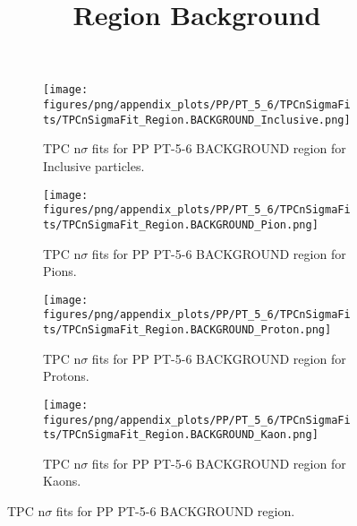             \begin{figure}[H]
                \title{Region Background}
                \begin{subfigure}[b]{0.5\textwidth}
                    \centering
                    \texttt{[image: figures/png/appendix\_plots/PP/PT\_5\_6/TPCnSigmaFits/TPCnSigmaFit\_Region.BACKGROUND\_Inclusive.png]}
                    \caption{TPC n$\sigma$ fits for PP PT-5-6 BACKGROUND region for Inclusive particles.}
                    \label{fig:appendix_PP_PT-5-6_BACKGROUND_Inclusive}
                \end{subfigure}
                \begin{subfigure}[b]{0.5\textwidth}
                    \centering
                    \texttt{[image: figures/png/appendix\_plots/PP/PT\_5\_6/TPCnSigmaFits/TPCnSigmaFit\_Region.BACKGROUND\_Pion.png]}
                    \caption{TPC n$\sigma$ fits for PP PT-5-6 BACKGROUND region for Pions.}
                    \label{fig:appendix_PP_PT-5-6_BACKGROUND_Pion}
                \end{subfigure}
                \begin{subfigure}[b]{0.5\textwidth}
                    \centering
                    \texttt{[image: figures/png/appendix\_plots/PP/PT\_5\_6/TPCnSigmaFits/TPCnSigmaFit\_Region.BACKGROUND\_Proton.png]}
                    \caption{TPC n$\sigma$ fits for PP PT-5-6 BACKGROUND region for Protons.}
                    \label{fig:appendix_PP_PT-5-6_BACKGROUND_Proton}
                \end{subfigure}
                \begin{subfigure}[b]{0.5\textwidth}
                    \centering
                    \texttt{[image: figures/png/appendix\_plots/PP/PT\_5\_6/TPCnSigmaFits/TPCnSigmaFit\_Region.BACKGROUND\_Kaon.png]}
                    \caption{TPC n$\sigma$ fits for PP PT-5-6 BACKGROUND region for Kaons.}
                    \label{fig:appendix_PP_PT-5-6_BACKGROUND_Kaon}
                \end{subfigure}
                \caption{TPC n$\sigma$ fits for PP PT-5-6 BACKGROUND region.}
                \label{fig:appendix_PP_PT-5-6_BACKGROUND}
            \end{figure}
            \clearpage
            
    
